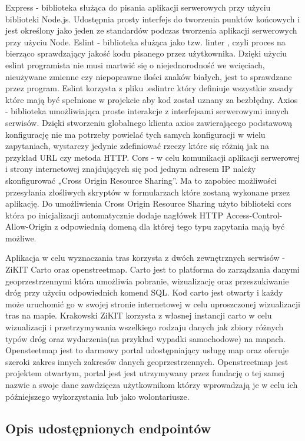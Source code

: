 Express - biblioteka służąca do pisania aplikacji serwerowych przy użyciu biblioteki Node.js. Udostępnia prosty interfejs do tworzenia punktów końcowych i jest określony jako jeden ze standardów podczas tworzenia aplikacji serwerowych przy użyciu Node.
Eslint - biblioteka służąca jako tzw. linter , czyli proces na bierząco sprawdzający jakość kodu pisanego przez użytkownika. Dzięki użyciu eslint programista nie musi martwić się o niejednorodność we wcięciach, nieużywane zmienne czy niepoprawne ilości znaków białych, jest to sprawdzane przez program. Eslint korzysta z pliku .eslintrc który definiuje wszystkie zasady które mają być spełnione w projekcie aby kod został uznany za bezbłędny.
Axios - biblioteka umożliwiająca proste interakcje z interfejsami serwerowymi innych serwisów. Dzięki stworzeniu globalnego klienta axios zawierającego podstawową konfigurację nie ma potrzeby powielać tych samych konfiguracji w wielu zapytaniach, wystarczy jedynie zdefiniować rzeczy które się różnią jak na przykład URL czy metoda HTTP.
Cors - w celu komunikacji aplikacji serwerowej i strony internetowej znajdujących się pod jednym adresem IP należy skonfigurować „Cross Origin Resource Sharing”. Ma to zapobiec możliwości przesyłania złośliwych skryptów w formularzach które zostaną wykonane przez aplikację. Do umożliwienia Cross Origin Resource Sharing użyto biblioteki cors która po inicjalizacji automatycznie dodaje nagłówek HTTP Access-Control-Allow-Origin z odpowiednią domeną dla której tego typu zapytania mają być możliwe.

Aplikacja w celu wyznaczania tras korzysta z dwóch zewnętrznych serwisów - ZiKIT Carto oraz openstreetmap. Carto jest to platforma do zarządzania danymi geoprzestrzennymi która umożliwia pobranie, wizualizację oraz przeszukiwanie dróg przy użyciu odpowiednich komend SQL. Kod carto jest otwarty i każdy może uruchomić go w swojej stronie internetowej w celu uproszczonej wizualizacji tras na mapie. Krakowski ZiKIT korzysta z własnej instancji carto w celu wizualizacji i przetrzymywania wszelkiego rodzaju danych jak zbiory różnych typów dróg oraz wydarzenia(na przykład wypadki samochodowe) na mapach.
Opensteetmap jest to darmowy portal udostępniający usługę map oraz oferuje szeroki zakres innych zakresów danych geoprzestrzennych. Openstreetmap jest projektem otwartym, portal jest jest utrzymywany przez fundację o tej samej nazwie a swoje dane zawdzięcza użytkownikom którzy wprowadzają je w celu ich późniejszego wykorzystania lub jako wolontariusze.

\subsection{Opis udostępnionych endpointów}


